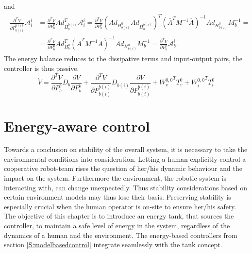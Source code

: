 \documentclass[a4paper,twoside, openright,12pt]{report}
\begin{document}
and
\begin{eqnarray}
\begin{aligned}
\frac{\partial^T V}{\partial P_{b(i)}^{b(i)}} \mathcal{A}_i^i &= \frac{\partial^T V}{\partial P_b^b}Ad_{H_b^{b(i)}}^T\mathcal{A}_i^i = \frac{\partial^T V}{\partial P_b^b} (Ad_{H_{b(i)}^0}Ad_{H_b^{b(i)}})^T (\bar{A}^TM^{-1}\bar{A})^{-1} Ad_{H_{b(i)}^0}M_b^{-1} = \\ 
&= \frac{\partial^T V}{\partial P_b^b} Ad_{H_b^0}^T (\bar{A}^TM^{-1}\bar{A})^{-1} Ad_{H_{b(i)}^0}M_b^{-1} = \frac{\partial^T V}{\partial P_b^b} \mathcal{A}_b^i.
\end{aligned}
\end{eqnarray}
The energy balance reduces to the dissipative terms and input-output pairs, the controller is thus passive.
\begin{equation}
\dot{V} = \frac{\partial^T V}{\partial P_b^b} D_b \frac{\partial V}{\partial P_b^b} + \frac{\partial^T V}{\partial P_{b(i)}^{b(i)}} D_{b(i)} \frac{\partial V}{\partial P_{b(i)}^{b(i)}} + {W_v^{0,0}}^T T_v^0 + {W_i^{0,0}}^T T_i^0
\end{equation}
 


\chapter{Energy-aware control}\label{C:Energy-aware control}
Towards a conclusion on stability of the overall system, it is necessary to take the environmental conditions into consideration. Letting a human explicitly control a cooperative robot-team rises the question of her/his dynamic behaviour and the impact on the system. Furthermore the environment, the robotic system is interacting with, can change unexpectedly. Thus stability considerations based on certain environment models may thus lose their basis. Preserving stability is especially crucial when the human operator is on-site to ensure her/his safety. The objective of this chapter is to introduce an energy tank, that sources the controller, to maintain a safe level of energy in the system, regardless of the dynamics of a human and the environment. The energy-based controllers from section \ref{S:modelbasedcontrol} integrate seamlessly with the tank concept.
\end{document}
